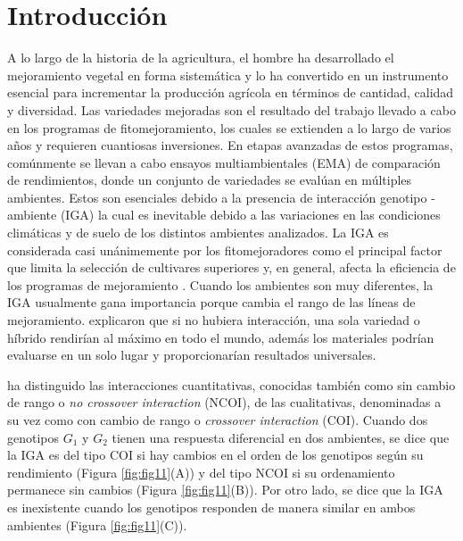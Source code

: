 

\chapter{Introducción}

A lo largo de la historia de la agricultura, el hombre ha desarrollado el mejoramiento vegetal en forma sistemática y lo ha convertido en un instrumento esencial para incrementar la producción agrícola en términos de cantidad, calidad y diversidad. Las variedades mejoradas son el resultado del trabajo llevado a cabo en los programas de fitomejoramiento, los cuales se extienden a lo largo de varios años y requieren cuantiosas inversiones. En etapas avanzadas de estos programas, comúnmente se llevan a cabo ensayos multiambientales (EMA) de comparación de rendimientos, donde un conjunto de variedades se evalúan en múltiples ambientes. Estos son esenciales debido a la presencia de interacción genotipo - ambiente (IGA) la cual es inevitable debido a las variaciones en las condiciones climáticas y de suelo de los distintos ambientes analizados. La IGA es considerada casi unánimemente por los fitomejoradores como el principal factor que limita la selección de cultivares superiores y, en general, afecta la eficiencia de los programas de mejoramiento \citep{Crossaetal1990, CruzMedina1992, KangMagari1996}. Cuando los ambientes son muy diferentes, la IGA usualmente gana importancia porque cambia el rango de las líneas de mejoramiento. \citet{GauchZobel1997} explicaron que si no hubiera interacción, una sola variedad o híbrido rendirían al máximo en todo el mundo, además los materiales podrían evaluarse en un solo lugar y proporcionarían resultados universales.


\citet{Peto1982} ha distinguido las interacciones cuantitativas, conocidas también como sin cambio de rango o \emph{no crossover interaction} (NCOI), de las cualitativas, denominadas a su vez como con
cambio de rango o \emph{crossover interaction} (COI). Cuando dos genotipos $G_1$ y $G_2$ tienen una respuesta diferencial en dos ambientes, se dice que la IGA es del tipo COI si hay cambios en el orden de los genotipos según su rendimiento (Figura \ref{fig:fig11}(A)) y del tipo NCOI si su ordenamiento permanece sin cambios (Figura  \ref{fig:fig11}(B)). Por otro lado, se dice que la IGA es inexistente cuando los genotipos responden de manera similar en ambos ambientes (Figura \ref{fig:fig11}(C)). 


